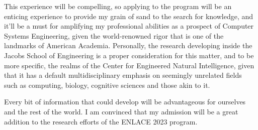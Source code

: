 This experience will be compelling, so applying to the program
will be an enticing experience to provide my grain of sand to
the search for knowledge, and it'll be a must for amplifying
my professional abilities as a prospect of Computer Systems
Engineering, given the world-renowned rigor that is one of the landmarks
of American Academia. Personally, the research developing inside the
Jacobs School of Engineering is a proper consideration for this matter,
and to be more specific, the realms of the Center for Engineered
Natural Intelligence, given that it has a default multidisciplinary 
emphasis on seemingly unrelated fields such as computing, biology, cognitive
sciences and those akin to it.

Every bit of information that could develop will be
advantageous for ourselves and the rest of the world. 
I am convinced that my admission will be a great addition to the
research efforts of the ENLACE 2023 program.